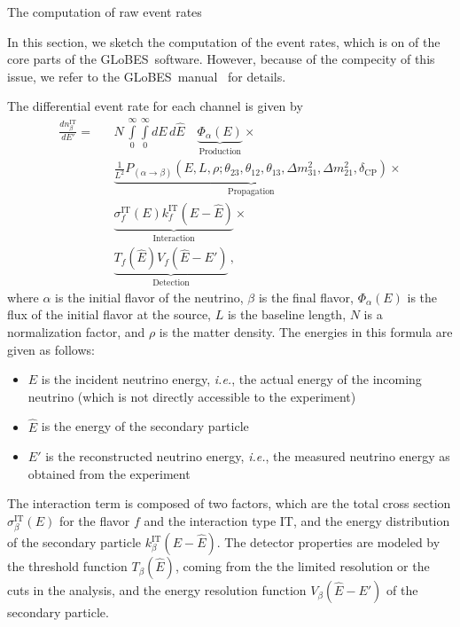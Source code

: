 \documentclass[12pt,a4paper]{article}
\makeatletter
\renewcommand{\section}{\@startsection{section}{1}{0em}{-\baselineskip}%
{\baselineskip}{\normalfont\large\bfseries}}
\newcommand{\ie}{{\it i.e.}}
\newcommand{\deltacp}{\delta_{\mathrm{CP}}}
\newcommand{\GLOBES}{{\sf GLoBES}}
\makeatother
\begin{document}
\section{The computation of raw event rates}

In this section, we sketch the computation of 
the event rates, which is on of the core parts of the \GLOBES\
software. However, because of the compecity of this issue,
we refer to the \GLOBES\ manual~\cite{Manual} for
details.  

The differential event rate for each channel is given by
\begin{eqnarray}
\label{equ:master_event}
\frac{dn_{\beta}^{\text{IT}}}{dE'}=&&N\,\int\limits_0^\infty \int\limits_0^\infty dE\,d\hat{E}\quad
\underbrace{\Phi_{\alpha} (E)}_{\mathrm{Production}} \times \nonumber\\
&&\underbrace{\frac{1}{L^2} P_{(\alpha\rightarrow\beta)}(E,L,\rho;\theta_{23},
\theta_{12},\theta_{13},
\Delta m^2_{31},\Delta m^2_{21},\deltacp)}_{\mathrm{Propagation}}
\times \nonumber \\ &&\underbrace{\sigma^{\text{IT}}_f(E)
k_f^{\text{IT}}(E-\hat{E})}_{\mathrm{Interaction}} \times \nonumber \\
&&\underbrace{ T_f(\hat{E}) V_f(\hat{E}-E')}_{\mathrm{Detection}}\,,
\end{eqnarray}
where $\alpha$ is the initial flavor of the neutrino, 
$\beta$ is the final flavor, $\Phi_{\alpha} (E)$ is the flux of the 
initial flavor at the
source, $L$ is the baseline length, $N$ is a normalization factor, and 
$\rho$ is the matter density. The energies in this formula are given as follows:
\begin{itemize}
\item
 $E$ is the incident neutrino energy, \ie, the actual energy of the 
incoming neutrino (which is not directly accessible to the experiment)
\item
 $\hat{E}$ is the energy of the secondary particle
\item
 $E'$ is the reconstructed neutrino energy, \ie, the measured
neutrino energy as obtained from the experiment
\end{itemize}
The interaction term is composed of 
two factors, which are the total cross section 
$\sigma^{\text{IT}}_\beta(E)$ for the flavor $f$ and
the interaction type IT, and the energy distribution of the 
secondary particle $k_\beta^{\text{IT}}(E-\hat{E})$.
The detector properties are 
modeled by the threshold function $T_\beta(\hat{E})$, coming from the the 
limited resolution or the cuts in the analysis, and the energy resolution 
function $V_\beta(\hat{E}-E')$ of the secondary particle. 
\end{document}
